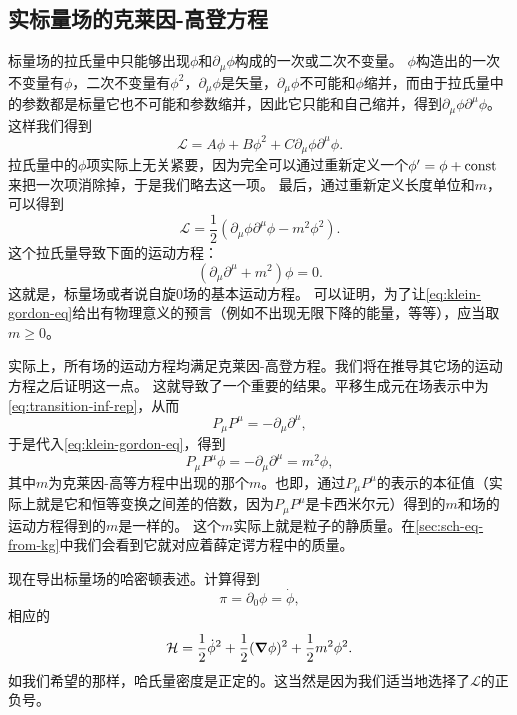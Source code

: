 \subsection{实标量场的克莱因-高登方程}\label{sec:k-g-eq}

标量场的拉氏量中只能够出现$\phi$和$\partial_\mu \phi$构成的一次或二次不变量。
$\phi$构造出的一次不变量有$\phi$，二次不变量有$\phi^2$，$\partial_\mu \phi$是矢量，$\partial_\mu \phi$不可能和$\phi$缩并，而由于拉氏量中的参数都是标量它也不可能和参数缩并，因此它只能和自己缩并，得到$\partial_\mu \phi \partial^\mu \phi$。
这样我们得到
\[
    \mathcal{L} = A \phi + B \phi^2 + C \partial_\mu \phi \partial^\mu \phi.
\]
拉氏量中的$\phi$项实际上无关紧要，因为完全可以通过重新定义一个$\phi' = \phi + \mathrm{const}$来把一次项消除掉，于是我们略去这一项。
最后，通过重新定义长度单位和$m$，可以得到
\begin{equation}
    \mathcal{L} = \frac{1}{2} (\partial_\mu \phi \partial^\mu \phi - m^2 \phi^2).
    \label{eq:klein-gordon-lagrangian}
\end{equation}
这个拉氏量导致下面的运动方程：
\begin{equation}
    (\partial_\mu \partial^\mu + m^2) \phi = 0.
    \label{eq:klein-gordon-eq}
\end{equation}
这就是，标量场或者说自旋0场的基本运动方程。
可以证明，为了让\eqref{eq:klein-gordon-eq}给出有物理意义的预言（例如不出现无限下降的能量，等等），应当取$m \geq 0$。

实际上，所有场的运动方程均满足克莱因-高登方程。我们将在推导其它场的运动方程之后证明这一点。
这就导致了一个重要的结果。平移生成元在场表示中为\eqref{eq:transition-inf-rep}，从而
\[
    P_\mu P^\mu = - \partial_\mu \partial^\mu,
\]
于是代入\eqref{eq:klein-gordon-eq}，得到
\[
    P_\mu P^\mu \phi = - \partial_\mu \partial^\mu = m^2 \phi,
\]
其中$m$为克莱因-高等方程中出现的那个$m$。也即，通过$P_\mu P^\mu$的表示的本征值（实际上就是它和恒等变换之间差的倍数，因为$P_\mu P^\mu$是卡西米尔元）得到的$m$和场的运动方程得到的$m$是一样的。
这个$m$实际上就是粒子的静质量。在\autoref{sec:sch-eq-from-kg}中我们会看到它就对应着薛定谔方程中的质量。

现在导出标量场的哈密顿表述。计算得到
\begin{equation}
    \pi = \partial_0 \phi = \dot{\phi},
    \label{eq:klein-gordon-pi}
\end{equation}
相应的
\begin{equation}
    \mathcal{H} = \frac{1}{2} \dot{\phi}^2 + \frac{1}{2} (\grad{\phi})^2 + \frac{1}{2} m^2 \phi^2.
\end{equation}
如我们希望的那样，哈氏量密度是正定的。这当然是因为我们适当地选择了$\mathcal{L}$的正负号。

